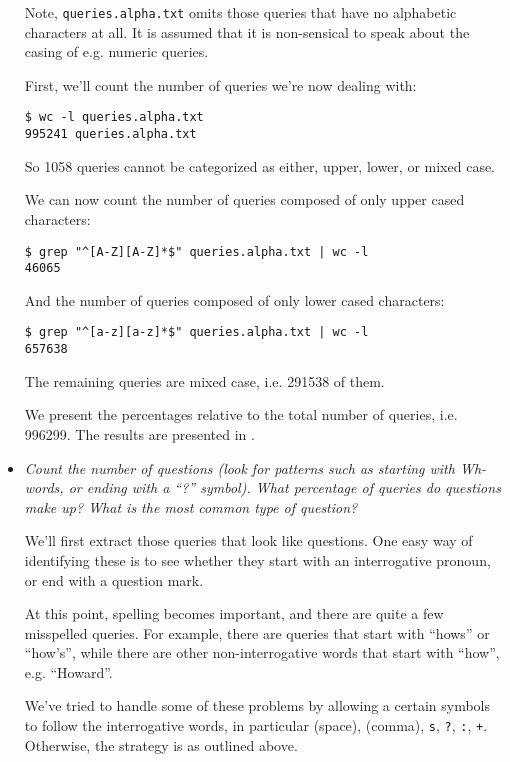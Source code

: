 \begin{itemize}
Note, \texttt{queries.alpha.txt} omits those queries that have no alphabetic
characters at all. It is assumed that it is non-sensical to speak about the
casing of e.g. numeric queries.

First, we'll count the number of queries we're now dealing with:

\begin{lstlisting}
$ wc -l queries.alpha.txt 
995241 queries.alpha.txt
\end{lstlisting}

So 1058 queries cannot be categorized as either, upper, lower, or mixed case.

We can now count the number of queries composed of only upper cased characters:

\begin{lstlisting}
$ grep "^[A-Z][A-Z]*$" queries.alpha.txt | wc -l
46065
\end{lstlisting}

And the number of queries composed of only lower cased characters:

\begin{lstlisting}
$ grep "^[a-z][a-z]*$" queries.alpha.txt | wc -l
657638
\end{lstlisting}

The remaining queries are mixed case, i.e. 291538 of them.

We present the percentages relative to the total number of queries, i.e.
996299. The results are presented in .

\item \emph{Count the number of questions (look for patterns such as starting
with Wh-words, or ending with a ``?''    symbol). What percentage of queries do
questions make up? What is the most common type of question?}

We'll first extract those queries that look like questions. One easy way of
identifying these is to see whether they start with an interrogative pronoun,
or end with a question mark.

At this point, spelling becomes important, and there are quite a few misspelled
queries. For example, there are queries that start with ``hows'' or ``how's'',
while there are other non-interrogative words that start with ``how'', e.g.
``Howard''.

We've tried to handle some of these problems by allowing a certain symbols to
follow the interrogative words, in particular (space), (comma), \texttt{s},
\texttt{?}, \texttt{:}, \texttt{+}. Otherwise, the strategy is as outlined
above.


\end{itemize}
